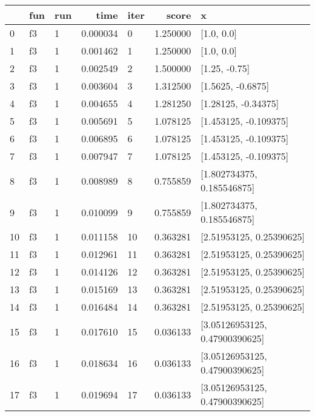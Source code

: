 \begin{tabular}{lllrlrl}
\toprule
{} & fun & run &      time & iter &     score &                                          x \\
\midrule
0   &  f3 &   1 &  0.000034 &    0 &  1.250000 &                                 [1.0, 0.0] \\
1   &  f3 &   1 &  0.001462 &    1 &  1.250000 &                                 [1.0, 0.0] \\
2   &  f3 &   1 &  0.002549 &    2 &  1.500000 &                              [1.25, -0.75] \\
3   &  f3 &   1 &  0.003604 &    3 &  1.312500 &                          [1.5625, -0.6875] \\
4   &  f3 &   1 &  0.004655 &    4 &  1.281250 &                        [1.28125, -0.34375] \\
5   &  f3 &   1 &  0.005691 &    5 &  1.078125 &                      [1.453125, -0.109375] \\
6   &  f3 &   1 &  0.006895 &    6 &  1.078125 &                      [1.453125, -0.109375] \\
7   &  f3 &   1 &  0.007947 &    7 &  1.078125 &                      [1.453125, -0.109375] \\
8   &  f3 &   1 &  0.008989 &    8 &  0.755859 &                 [1.802734375, 0.185546875] \\
9   &  f3 &   1 &  0.010099 &    9 &  0.755859 &                 [1.802734375, 0.185546875] \\
10  &  f3 &   1 &  0.011158 &   10 &  0.363281 &                   [2.51953125, 0.25390625] \\
11  &  f3 &   1 &  0.012961 &   11 &  0.363281 &                   [2.51953125, 0.25390625] \\
12  &  f3 &   1 &  0.014126 &   12 &  0.363281 &                   [2.51953125, 0.25390625] \\
13  &  f3 &   1 &  0.015169 &   13 &  0.363281 &                   [2.51953125, 0.25390625] \\
14  &  f3 &   1 &  0.016484 &   14 &  0.363281 &                   [2.51953125, 0.25390625] \\
15  &  f3 &   1 &  0.017610 &   15 &  0.036133 &             [3.05126953125, 0.47900390625] \\
16  &  f3 &   1 &  0.018634 &   16 &  0.036133 &             [3.05126953125, 0.47900390625] \\
17  &  f3 &   1 &  0.019694 &   17 &  0.036133 &             [3.05126953125, 0.47900390625] \\

\end{tabular}
